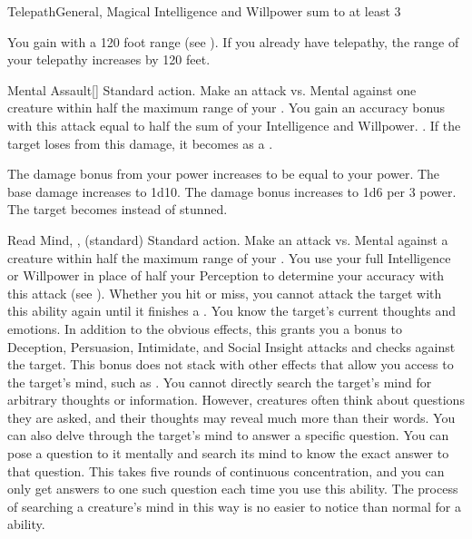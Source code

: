   \begin{magicalfeat}{Telepath}{General, Magical}
    \featpre Intelligence and Willpower sum to at least 3

     You gain  with a 120 foot range (see ).
    If you already have telepathy, the range of your telepathy increases by 120 feet.

    \begin{magicalactiveability}{Mental Assault}[]
      \abilityusagetime Standard action.
      \rankline
      Make an attack vs. Mental against one creature within half the maximum range of your .
      You gain an accuracy bonus with this attack equal to half the sum of your Intelligence and Willpower.
      \hit {}.
      If the target loses  from this damage, it becomes \stunned as a .

      \rankline
       The damage bonus from your power increases to be equal to your power.
       The base damage increases to 1d10.
       The damage bonus increases to 1d6 per 3 power.
       The target becomes \confused instead of stunned.
    \end{magicalactiveability}

    \begin{magicalsustainability}{Read Mind}{, ,  (standard)}
      \abilityusagetime Standard action.
      \rankline
      Make an attack vs. Mental against a creature within half the maximum range of your .
      You use your full Intelligence or Willpower in place of half your Perception to determine your accuracy with this attack (see ).
      Whether you hit or miss, you cannot attack the target with this ability again until it finishes a .
      \hit You know the target's current thoughts and emotions.
      In addition to the obvious effects, this grants you a  bonus to Deception, Persuasion, Intimidate, and Social Insight attacks and checks against the target.
      This bonus does not stack with other effects that allow you access to the target's mind, such as .
      You cannot directly search the target's mind for arbitrary thoughts or information.
      However, creatures often think about questions they are asked, and their thoughts may reveal much more than their words.
      \crit You can also delve through the target's mind to answer a specific question.
      You can pose a question to it mentally and search its mind to know the exact answer to that question.
      This takes five rounds of continuous concentration, and you can only get answers to one such question each time you use this ability.
      The process of searching a creature's mind in this way is no easier to notice than normal for a  ability.


\end{magicalsustainability}
\end{magicalfeat}
